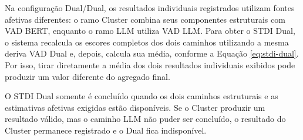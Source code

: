 Na configuração Dual/Dual, os resultados individuais registrados utilizam fontes afetivas diferentes: o ramo Cluster combina seus componentes estruturais com VAD BERT, enquanto o ramo LLM utiliza VAD LLM. Para obter o STDI Dual, o sistema recalcula os escores completos dos dois caminhos utilizando a mesma deriva VAD Dual e, depois, calcula sua média, conforme a Equação \ref{eq:stdi-dual}. Por isso, tirar diretamente a média dos dois resultados individuais exibidos pode produzir um valor diferente do agregado final.

O STDI Dual somente é concluído quando os dois caminhos estruturais e as estimativas afetivas exigidas estão disponíveis. Se o Cluster produzir um resultado válido, mas o caminho LLM não puder ser concluído, o resultado do Cluster permanece registrado e o Dual fica indisponível.
